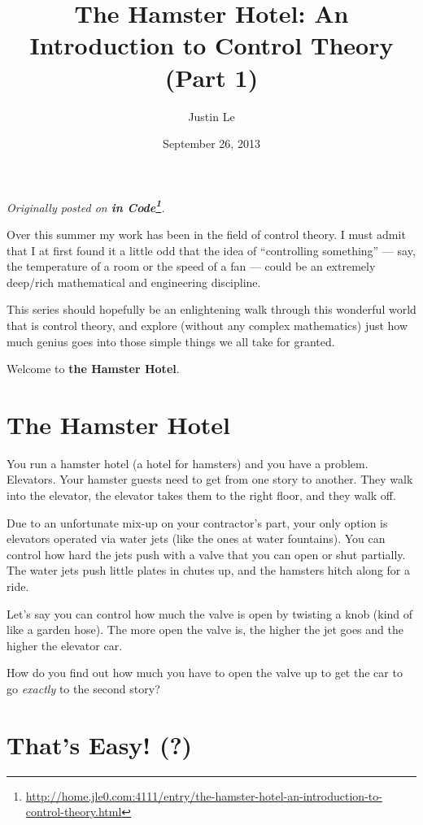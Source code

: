 \documentclass[]{article}
\title{The Hamster Hotel: An Introduction to Control Theory (Part 1)}
\author{Justin Le}
\date{September 26, 2013}
\renewcommand{\href}[2]{#2\footnote{\url{#1}}}
\begin{document}
\maketitle

\emph{Originally posted on
\textbf{\href{http://home.jle0.com:4111/entry/the-hamster-hotel-an-introduction-to-control-theory.html}{in
Code}}.}

Over this summer my work has been in the field of control theory. I must admit that I at first found
it a little odd that the idea of ``controlling something'' --- say, the temperature of a room or the
speed of a fan --- could be an extremely deep/rich mathematical and engineering discipline.

This series should hopefully be an enlightening walk through this wonderful world that is control
theory, and explore (without any complex mathematics) just how much genius goes into those simple
things we all take for granted.

Welcome to \textbf{the Hamster Hotel}.

\section{The Hamster Hotel}\label{the-hamster-hotel}

You run a hamster hotel (a hotel for hamsters) and you have a problem. Elevators. Your hamster
guests need to get from one story to another. They walk into the elevator, the elevator takes them
to the right floor, and they walk off.

Due to an unfortunate mix-up on your contractor's part, your only option is elevators operated via
water jets (like the ones at water fountains). You can control how hard the jets push with a valve
that you can open or shut partially. The water jets push little plates in chutes up, and the
hamsters hitch along for a ride.

Let's say you can control how much the valve is open by twisting a knob (kind of like a garden
hose). The more open the valve is, the higher the jet goes and the higher the elevator car.

How do you find out how much you have to open the valve up to get the car to go \emph{exactly} to
the second story?

\section{That's Easy! (?)}\label{thats-easy}
\end{document}
